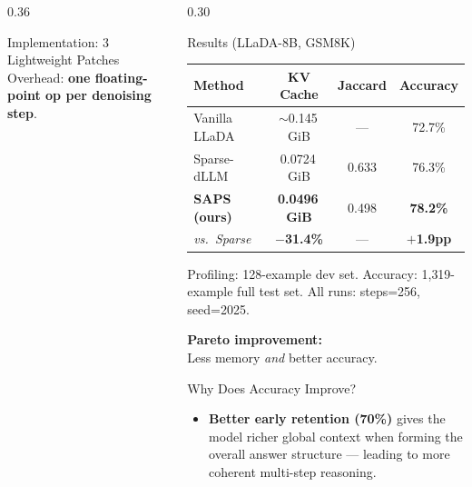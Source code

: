 \documentclass[final]{beamer}
\begin{document}
\begin{frame}[t]{}
\begin{columns}[t,totalwidth=\linewidth]
\begin{column}{0.36\linewidth}
\begin{block}{Implementation: 3 Lightweight Patches}
    \vspace{0.4em}
    Overhead: \textbf{one floating-point op per denoising step}.
  \end{block}

\end{column}

\begin{column}{0.30\linewidth}

  \begin{block}{Results (LLaDA-8B, GSM8K)}

    \begin{center}
    \begin{tabular}{lccc}
      \toprule
      \textbf{Method} & \textbf{KV Cache} & \textbf{Jaccard} & \textbf{Accuracy} \\
      \midrule
      Vanilla LLaDA   & $\sim$0.145\,GiB & — & 72.7\% \\
      Sparse-dLLM     & 0.0724\,GiB      & 0.633 & 76.3\% \\
      \rowcolor{accentGreen!18}
      \textbf{SAPS (ours)} & \textbf{0.0496\,GiB} & 0.498 & \textbf{78.2\%} \\
      \midrule
      \rowcolor{accentGreen!10}
      \textit{vs.\ Sparse} & {\color{accentGreen}\textbf{$-$31.4\%}} & — & {\color{accentGreen}\textbf{$+$1.9pp}} \\
      \bottomrule
    \end{tabular}
    \end{center}

    \vspace{0.5em}
    {\small Profiling: 128-example dev set.\;
            Accuracy: 1{,}319-example full test set.\;
            All runs: steps=256, seed=2025.}

    \vspace{0.8em}
    {\large\color{cmuRed}\textbf{Pareto improvement:}\\
    Less memory \emph{and} better accuracy.}
  \end{block}

  \vspace{0.8em}

  \begin{block}{Why Does Accuracy Improve?}
    \begin{itemize}
      \item \textbf{Better early retention (70\%)} gives the model
            richer global context when forming the overall answer
            structure — leading to more coherent multi-step reasoning.


\end{itemize}
\end{block}
\end{column}
\end{columns}
\end{frame}
\end{document}
